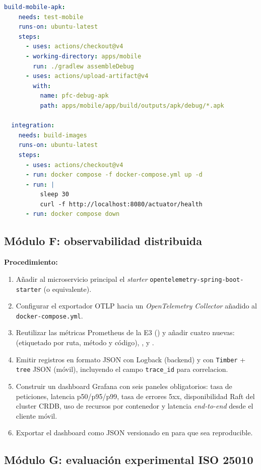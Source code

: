 \documentclass[11pt,a4paper]{article}
\begin{document}
\begin{lstlisting}[language=yaml,caption={Esqueleto del pipeline .github/workflows/ci-cd.yml.},label={lst:ci}]
  build-mobile-apk:
    needs: test-mobile
    runs-on: ubuntu-latest
    steps:
      - uses: actions/checkout@v4
      - working-directory: apps/mobile
        run: ./gradlew assembleDebug
      - uses: actions/upload-artifact@v4
        with:
          name: pfc-debug-apk
          path: apps/mobile/app/build/outputs/apk/debug/*.apk

  integration:
    needs: build-images
    runs-on: ubuntu-latest
    steps:
      - uses: actions/checkout@v4
      - run: docker compose -f docker-compose.yml up -d
      - run: |
          sleep 30
          curl -f http://localhost:8080/actuator/health
      - run: docker compose down
    \end{lstlisting}

\subsection{Módulo F: observabilidad distribuida}

    \textbf{Procedimiento:}
    \begin{enumerate}
        \item Añadir al microservicio principal el \emph{starter} \texttt{opentelemetry-spring-boot-starter} (o equivalente).
        \item Configurar el exportador OTLP hacia un \textit{OpenTelemetry Collector} añadido al \texttt{docker-compose.yml}.
        \item Reutilizar las métricas Prometheus de la E3 () y añadir cuatro nuevas:  (etiquetado por ruta, método y código), ,  y .
        \item Emitir registros en formato JSON con Logback (backend) y con \texttt{Timber} + \texttt{tree} JSON (móvil), incluyendo el campo \texttt{trace\_id} para correlacion.
        \item Construir un dashboard Grafana con seis paneles obligatorios: tasa de peticiones, latencia p50/p95/p99, tasa de errores 5xx, disponibilidad Raft del cluster CRDB, uso de recursos por contenedor y latencia \textit{end-to-end} desde el cliente móvil.
        \item Exportar el dashboard como JSON versionado en  para que sea reproducible.
    \end{enumerate}

\subsection{Módulo G: evaluación experimental ISO 25010}
\end{document}

